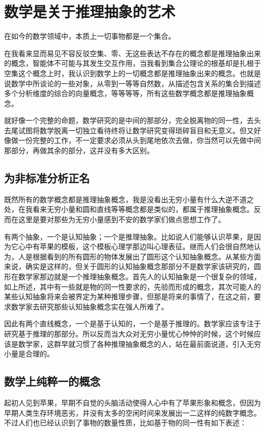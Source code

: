 \documentclass[12pt,oneside]{book}
\begin{document}
\section{数学是关于推理抽象的艺术}
\begin{bookref}[frametitle={\cite{Elements of Set Theory}}]
在如今的数学领域中，本质上一切事物都是一个集合。
\end{bookref}

在我看来显而易见不容反驳空集、零、无这些表达不存在的概念都是推理抽象出来的概念，智能体不可能与其发生交互作用，当我看到集合公理论的根基却是扎根于空集这个概念上时，我认识到数学上的一切概念都是推理抽象出来的概念。也就是说数学中所谈论的一些对象，从零到一等等自然数，从描述包含关系的集合到描述多个分析维度的综合的向量概念，等等等等，所有这些数学概念都是推理抽象概念。

就好像一个完整的命题，数学研究的是中间的那部分，完全脱离物的同一性，去头去尾试图将数学脱离一切独立看待终将让数学研究变得琐碎盲目和无意义。但又好像做一份完整的工作，不一定要求必须从头到尾地依次去做，你当然可以先做中间那部分，再做其余的部分，这并没有多大区别。


\subsection{为非标准分析正名}
既然所有的数学概念都是推理抽象概念，我是没看出无穷小量有什么大逆不道之处，在我看来无穷小量和圆和直线等等概念都是类似的，都属于推理抽象概念。反而在这里是要对那些为无穷小量感到不安的数学家们做点思想工作了。

有两个抽象，一个是认知抽象；一个是推理抽象。比如说人们能够认识苹果，是因为它心中有苹果的模板，这个模板心理学那边叫心理表征。继而人们会很自然地认为，人是根据看到的所有圆形的物体发展出了圆形这个认知抽象概念。从某些方面来说，确实是这样的，但关于圆形的认知抽象概念那部分不是数学家该研究的，圆形在数学家那边就是一个推理抽象概念。首先人的认知抽象是一个很复杂的领域，如上所述，其中有一些就是物的同一性要求的，先验而形成的概念，其次可能人的某些认知抽象将来会被界定为某种推理步骤，但那是将来的事情了，在这之前，要求数学家去研究那些认知抽象概念实在强人所难了。

因此有两个直线概念，一个是基于认知的，一个是基于推理的。数学家应该专注于研究基于推理的那部分。所以反而当大众对无穷小量忧心忡忡的时候，这个时候应该是数学家，这群早就习惯了各种推理抽象概念的人，站在最前面说道，引入无穷小量是合理的。


\subsection{数学上纯粹一的概念}
起初人见到苹果，早期不自觉的头脑活动使得人心中有了苹果形象和概念，但因为早期人类生存环境恶劣，并没有太多的空闲时间来发展出一二这样的纯数字概念。不过人们也已经认识到了事物的数量性质，比如基于物的同一性有如下表述：
\end{document}
